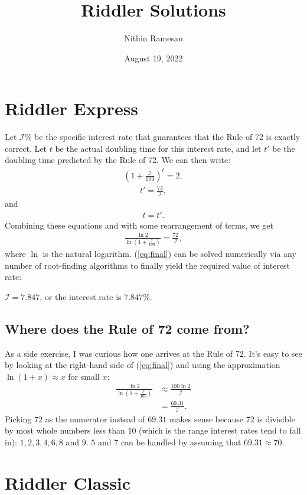\documentclass[11pt]{article}
\title{Riddler Solutions}
\date{August 19, 2022}
\author{Nithin Ramesan}
\theoremstyle{definition}
\begin{document}
	\maketitle
	\section{Riddler Express}
	Let $\mathcal{I}$\% be the specific interest rate that guarantees that the Rule of 72 is exactly correct. Let $t$ be the actual doubling time for this interest rate, and let $t'$ be the doubling time predicted by the Rule of 72. We can then write:
	\begin{align}
		\left(1 + \frac{\mathcal{I}}{100}\right)^t = 2,
	\end{align}
\begin{align}
	t' = \frac{72}{\mathcal{I}},
\end{align}
and
\begin{align}
	t=t'.
\end{align}
Combining these equations and with some rearrangement of terms, we get
\begin{align}
	\label{eq:final}
	\frac{\ln 2}{\ln \left(1 + \frac{\mathcal{I}}{100}\right)} = \frac{72}{\mathcal{I}},
\end{align}
where $\ln$ is the natural logarithm. (\ref{eq:final}) can be solved numerically via any number of root-finding algorithms to finally yield the required value of interest rate:
\begin{center}
	$\mathcal{I}=7.847$, or the interest rate is $7.847$\%.
\end{center}
\subsection{Where does the Rule of 72 come from?}
As a side exercise, I was curious how one arrives at the Rule of 72. It's easy to see by looking at the right-hand side of (\ref{eq:final}) and using the approximation $\ln(1+x)\approx x$ for small $x$:
\begin{align*}
	\frac{\ln 2}{\ln \left(1 + \frac{\mathcal{I}}{100}\right)} &\approx \frac{100\ln 2}{\mathcal{I}}\\
	&= \frac{69.31}{\mathcal{I}}.
\end{align*}
Picking $72$ as the numerator instead of $69.31$ makes sense because $72$ is divisible by most whole numbers less than $10$ (which is the range interest rates tend to fall in): $1, 2, 3, 4, 6, 8$ and $9$. $5 \text{ and } 7$ can be handled by assuming that $69.31 \approx 70$.
\section{Riddler Classic}
\end{document}
